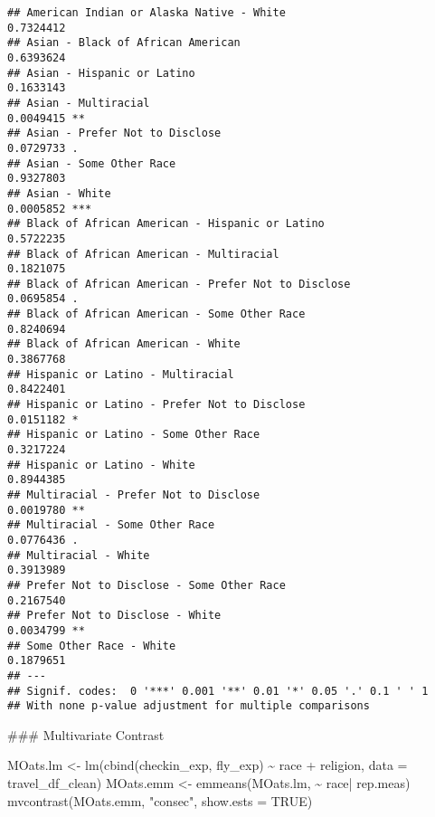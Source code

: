 \documentclass[
]{article}
\newenvironment{Shaded}{\begin{snugshade}}{\end{snugshade}}
\newcommand{\AttributeTok}[1]{\textcolor[rgb]{0.77,0.63,0.00}{#1}}
\newcommand{\ConstantTok}[1]{\textcolor[rgb]{0.00,0.00,0.00}{#1}}
\newcommand{\FunctionTok}[1]{\textcolor[rgb]{0.00,0.00,0.00}{#1}}
\newcommand{\NormalTok}[1]{#1}
\newcommand{\OtherTok}[1]{\textcolor[rgb]{0.56,0.35,0.01}{#1}}
\newcommand{\SpecialCharTok}[1]{\textcolor[rgb]{0.00,0.00,0.00}{#1}}
\newcommand{\StringTok}[1]{\textcolor[rgb]{0.31,0.60,0.02}{#1}}
\begin{document}
\begin{verbatim}
## American Indian or Alaska Native - White                     0.7324412    
## Asian - Black of African American                            0.6393624    
## Asian - Hispanic or Latino                                   0.1633143    
## Asian - Multiracial                                          0.0049415 ** 
## Asian - Prefer Not to Disclose                               0.0729733 .  
## Asian - Some Other Race                                      0.9327803    
## Asian - White                                                0.0005852 ***
## Black of African American - Hispanic or Latino               0.5722235    
## Black of African American - Multiracial                      0.1821075    
## Black of African American - Prefer Not to Disclose           0.0695854 .  
## Black of African American - Some Other Race                  0.8240694    
## Black of African American - White                            0.3867768    
## Hispanic or Latino - Multiracial                             0.8422401    
## Hispanic or Latino - Prefer Not to Disclose                  0.0151182 *  
## Hispanic or Latino - Some Other Race                         0.3217224    
## Hispanic or Latino - White                                   0.8944385    
## Multiracial - Prefer Not to Disclose                         0.0019780 ** 
## Multiracial - Some Other Race                                0.0776436 .  
## Multiracial - White                                          0.3913989    
## Prefer Not to Disclose - Some Other Race                     0.2167540    
## Prefer Not to Disclose - White                               0.0034799 ** 
## Some Other Race - White                                      0.1879651    
## ---
## Signif. codes:  0 '***' 0.001 '**' 0.01 '*' 0.05 '.' 0.1 ' ' 1
## With none p-value adjustment for multiple comparisons
\end{verbatim}

\hfill\break
\#\#\# Multivariate Contrast

\begin{Shaded}
\begin{Highlighting}[]
\NormalTok{MOats.lm }\OtherTok{\textless{}{-}} \FunctionTok{lm}\NormalTok{(}\FunctionTok{cbind}\NormalTok{(checkin\_exp, fly\_exp) }\SpecialCharTok{\textasciitilde{}}\NormalTok{ race }\SpecialCharTok{+}\NormalTok{ religion, }\AttributeTok{data =}\NormalTok{ travel\_df\_clean)}
\NormalTok{MOats.emm }\OtherTok{\textless{}{-}} \FunctionTok{emmeans}\NormalTok{(MOats.lm, }\SpecialCharTok{\textasciitilde{}}\NormalTok{ race}\SpecialCharTok{|}\NormalTok{ rep.meas)}
\FunctionTok{mvcontrast}\NormalTok{(MOats.emm, }\StringTok{"consec"}\NormalTok{, }\AttributeTok{show.ests =} \ConstantTok{TRUE}\NormalTok{) }
\end{Highlighting}
\end{Shaded}
\end{document}
